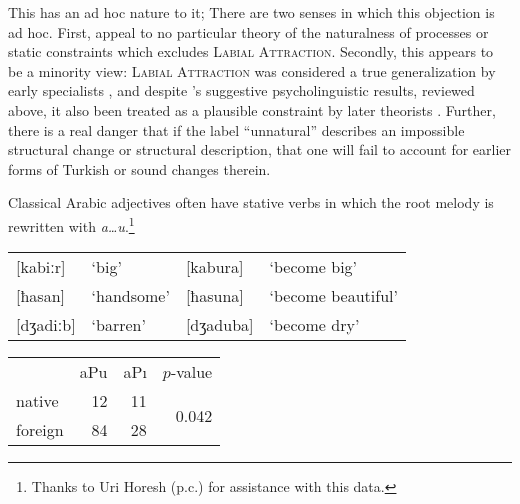 This has an ad hoc nature to it; 
There are two senses in which this objection is ad hoc. 
First, \citeauthor{Becker2011} appeal to no particular theory of the naturalness of processes or static constraints which excludes \textsc{Labial Attraction}. 
Secondly, this appears to be a minority view: \textsc{Labial Attraction} was considered a true generalization by early specialists
\citep[e.g.,][]{Lees1966a}, and despite \citeauthor{Zimmer1969}'s suggestive psycholinguistic results, reviewed above, it also been treated as a plausible constraint by later theorists \citep[e.g.,][]{NiChiosain1993,Ito1993,Ito1995a,Zuraw2000}.
Further, there is a real danger that if the label ``unnatural'' 
describes an impossible structural change or structural description, that one will fail to account for earlier forms of Turkish or sound changes therein.

Classical Arabic adjectives often have stative verbs in which the root melody is rewritten with \emph{a\ldots{}u}.\footnote{Thanks to Uri Horesh (p.c.) for assistance with this data.}

\begin{example}
\begin{tabular}{l l l l}
\buf{}[kabiːr]  & `big'      & [kabura]  & `become big'       \\
\buf{}[ħasan]   & `handsome' & [ħasuna]  & `become beautiful' \\
\buf{}[dʒadiːb] & `barren'   & [dʒaduba] & `become dry'       \\
\end{tabular}
\end{example}

 
\citet{Inkelas2001}

\begin{example}
\begin{tabular}{l r r r}
        & {a}P{u} & {a}P{ı} & $p$-value \\
native  & 12                & 11                & \multirow{2}{*}{0.042} \\
foreign & 84                & 28                \\
\end{tabular}
\end{example}

